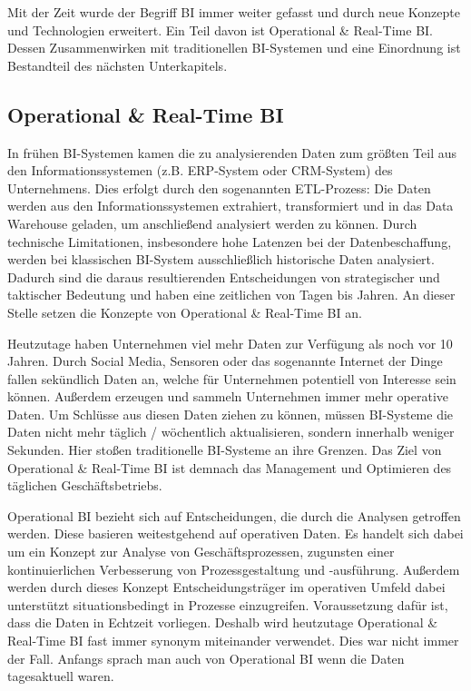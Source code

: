 Mit der Zeit wurde der Begriff \ac{BI} immer weiter gefasst und durch neue Konzepte und Technologien erweitert. Ein Teil davon ist Operational \& Real-Time \ac{BI}. Dessen Zusammenwirken mit traditionellen BI-Systemen und eine Einordnung ist Bestandteil des nächsten Unterkapitels.

\subsection{Operational \& Real-Time BI}
In frühen BI-Systemen kamen die zu analysierenden Daten zum größten Teil aus den Informationssystemen (z.B. ERP-System oder CRM-System) des Unternehmens. Dies erfolgt durch den sogenannten ETL-Prozess: Die Daten werden aus den Informationssystemen extrahiert, transformiert und in das Data Warehouse geladen, um anschließend analysiert werden zu können. \autocite[Vgl.][S. 132]{Glucho2008} Durch technische Limitationen, insbesondere hohe Latenzen bei der Datenbeschaffung, werden bei klassischen BI-System ausschließlich historische Daten analysiert. Dadurch sind die daraus resultierenden Entscheidungen von strategischer und taktischer Bedeutung und haben eine zeitlichen von Tagen bis Jahren. \autocite[vgl.][S. 36]{Sandu2008} An dieser Stelle setzen die Konzepte von Operational \& Real-Time BI an. 

Heutzutage haben Unternehmen viel mehr Daten zur Verfügung als noch vor 10 Jahren. Durch Social Media, Sensoren oder das sogenannte Internet der Dinge fallen sekündlich Daten an, welche für Unternehmen potentiell von Interesse sein können. Außerdem erzeugen und sammeln Unternehmen immer mehr operative Daten. Um Schlüsse aus diesen Daten ziehen zu können, müssen BI-Systeme die Daten nicht mehr täglich / wöchentlich aktualisieren, sondern innerhalb weniger Sekunden. Hier stoßen traditionelle BI-Systeme an ihre Grenzen. \autocite[Vgl.][S. 257]{rutz} Das Ziel von Operational \& Real-Time BI ist demnach das Management und Optimieren des täglichen Geschäftsbetriebs. \autocite[Vgl.][S. 36]{Sandu2008}

Operational BI bezieht sich auf Entscheidungen, die durch die Analysen getroffen werden. Diese basieren weitestgehend auf operativen Daten. Es handelt sich dabei um ein Konzept zur Analyse von Geschäftsprozessen, zugunsten einer kontinuierlichen Verbesserung von Prozessgestaltung und -ausführung. \autocite[Vgl.][S. 148]{inproceedings} Außerdem werden durch dieses Konzept Entscheidungsträger im operativen Umfeld dabei unterstützt situationsbedingt in Prozesse einzugreifen. Voraussetzung dafür ist, dass die Daten in Echtzeit vorliegen. Deshalb wird heutzutage Operational \& Real-Time BI fast immer synonym miteinander verwendet. Dies war nicht immer der Fall. Anfangs sprach man auch von Operational BI wenn die Daten tagesaktuell waren. \autocite[Vgl.][S. 5]{eckerson} 

